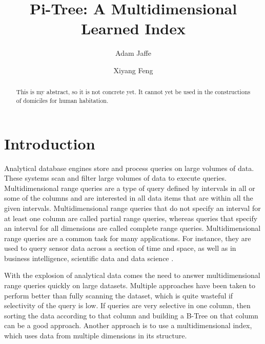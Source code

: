 \documentclass[sigconf,10pt]{acmart}
\begin{document}
\title{Pi-Tree: A Multidimensional Learned Index}


\author{Adam Jaffe}

\author{Xiyang Feng}



\begin{abstract}
  This is my abstract, so it is not concrete yet. It cannot yet be used
  in the constructions of domiciles for human habitation.
\end{abstract}


\maketitle

\section{Introduction}

Analytical database engines store and process queries on large volumes of data.
These systems scan and filter large volumes of data to execute queries.
Multidimensional range queries are a type of query defined by 
intervals in all or some of the columns and are interested in all data items
that are within all the given intervals. Multidimensional range queries that do not specify
an interval for at least one column are called partial range queries, whereas queries that specify
an interval for all dimensions are called complete range queries.
Multidimensional range queries are a common task for many applications.
For instance, they are used to query sensor data across a section of time and space, as well as in business
intelligence, scientific data and data science \cite{ModernMDRQ}.

With the explosion of analytical data comes the need to answer multidimensional range queries
quickly on large datasets. Multiple approaches have been taken to perform better than
fully scanning the dataset, which is quite wasteful if selectivity
of the query is low. If queries are very selective in one column, then sorting the data
according to that column and building a B-Tree on that column can be a good approach. 
Another approach is to use a multidimensional index, which uses data from multiple dimensions
in its structure. 
\end{document}
